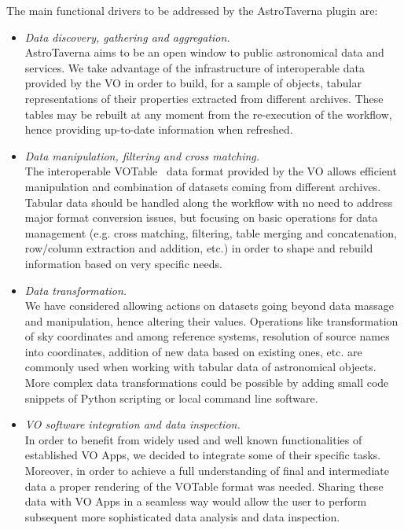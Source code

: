 \documentclass{aa}
\begin{document}
The main functional drivers to be addressed by the AstroTaverna plugin are:
\begin{itemize}
\item
\textit{Data discovery, gathering and aggregation.}\\
AstroTaverna aims to be an open window to public astronomical data and services. We take advantage of the infrastructure of interoperable data provided by the VO in order to build, for a sample of objects, tabular representations of their properties extracted from different archives. These tables may be rebuilt at any moment from the re-execution of the workflow, hence providing up-to-date information when refreshed.
\item
\textit{Data manipulation, filtering and cross matching.}\\
The interoperable VOTable~\citep{Ochsenbein2009} data format provided by the VO allows efficient manipulation and combination of datasets coming from different archives. Tabular data should be handled along the workflow with no need to address major format conversion issues, but focusing on basic operations for data management (e.g. cross matching, filtering, table merging and concatenation, row/column extraction and addition, etc.) in order to shape and rebuild information based on very specific needs.
\item
\textit{Data transformation.}\\
We have considered allowing actions on datasets going beyond data massage and manipulation, hence altering their values. Operations like transformation of sky coordinates and among reference systems, resolution of source names into coordinates, addition of new data based on existing ones, etc. are commonly used when working with tabular data of astronomical objects. More complex data transformations could be possible by adding small code snippets of Python scripting or local command line software.
\item
\textit{VO software integration and data inspection.}\\
In order to benefit from widely used and well known functionalities of established VO Apps, we decided to integrate some of their specific tasks. Moreover, in order to achieve a full understanding of final and intermediate data a proper rendering of the VOTable format was needed. Sharing these data with VO Apps in a seamless way would allow the user to perform subsequent more sophisticated data analysis and data inspection.
\end{itemize}
\end{document}

